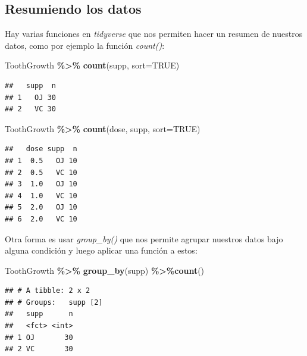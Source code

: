 \documentclass[
]{book}
\newenvironment{Shaded}{\begin{snugshade}}{\end{snugshade}}
\newcommand{\AttributeTok}[1]{\textcolor[rgb]{0.13,0.29,0.53}{#1}}
\newcommand{\ConstantTok}[1]{\textcolor[rgb]{0.56,0.35,0.01}{#1}}
\newcommand{\FunctionTok}[1]{\textcolor[rgb]{0.13,0.29,0.53}{\textbf{#1}}}
\newcommand{\NormalTok}[1]{#1}
\newcommand{\SpecialCharTok}[1]{\textcolor[rgb]{0.81,0.36,0.00}{\textbf{#1}}}
\begin{document}
\newpage

\subsection{Resumiendo los datos}\label{resumiendo-los-datos}

\hfill\break
Hay varias funciones en \emph{tidyverse} que nos permiten hacer un resumen de nuestros datos, como por ejemplo la función \emph{count()}:\\

\begin{Shaded}
\begin{Highlighting}[]
\NormalTok{ToothGrowth }\SpecialCharTok{\%\textgreater{}\%} \FunctionTok{count}\NormalTok{(supp, }\AttributeTok{sort=}\ConstantTok{TRUE}\NormalTok{)}
\end{Highlighting}
\end{Shaded}

\begin{verbatim}
##   supp  n
## 1   OJ 30
## 2   VC 30
\end{verbatim}

\begin{Shaded}
\begin{Highlighting}[]
\NormalTok{ToothGrowth }\SpecialCharTok{\%\textgreater{}\%} \FunctionTok{count}\NormalTok{(dose, supp, }\AttributeTok{sort=}\ConstantTok{TRUE}\NormalTok{)}
\end{Highlighting}
\end{Shaded}

\begin{verbatim}
##   dose supp  n
## 1  0.5   OJ 10
## 2  0.5   VC 10
## 3  1.0   OJ 10
## 4  1.0   VC 10
## 5  2.0   OJ 10
## 6  2.0   VC 10
\end{verbatim}

\hfill\break
Otra forma es usar \emph{group\_by()} que nos permite agrupar nuestros datos bajo alguna condición y luego aplicar una función a estos:

\begin{Shaded}
\begin{Highlighting}[]
\NormalTok{ToothGrowth }\SpecialCharTok{\%\textgreater{}\%} \FunctionTok{group\_by}\NormalTok{(supp) }\SpecialCharTok{\%\textgreater{}\%}\FunctionTok{count}\NormalTok{()}
\end{Highlighting}
\end{Shaded}

\begin{verbatim}
## # A tibble: 2 x 2
## # Groups:   supp [2]
##   supp      n
##   <fct> <int>
## 1 OJ       30
## 2 VC       30
\end{verbatim}
\end{document}
